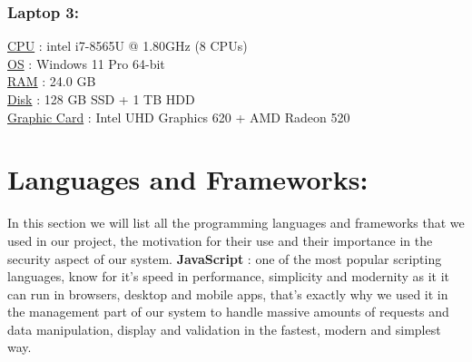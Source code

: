\documentclass[]{uc2pfecaneva}
\begin{document}
    \subsubsection{Laptop 3: }
    \underline{CPU} :  intel i7-8565U @ 1.80GHz (8 CPUs) \\
    \underline{OS} :  Windows 11 Pro 64-bit \\
    \underline{RAM} : 24.0 GB \\
    \underline{Disk} :  128 GB SSD + 1 TB HDD \\
    \underline{Graphic Card} :  Intel UHD Graphics 620 + AMD Radeon 520

    \section{Languages and Frameworks: }
     In this section we will list all the programming languages and frameworks that we used in our project, the motivation for their use and their importance in the security aspect of our system. \clearpage
    \noindent
    \textbf{JavaScript} :  one of the most popular scripting languages, know for it’s speed in performance, simplicity and modernity as it it can run in browsers, desktop and mobile apps, that’s exactly why we used it in the management part of our system to handle massive amounts of requests and data manipulation, display and validation in the fastest, modern and simplest way. \\
\end{document}
